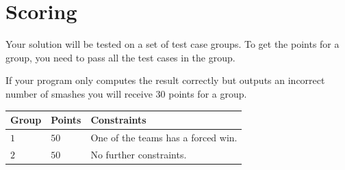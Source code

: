 \section*{Scoring}
Your solution will be tested on a set of test case groups.
To get the points for a group, you need to pass all the test cases in the group.

If your program only computes the result correctly but outputs an incorrect number of smashes you will receive $30$ points for a group.
\noindent
\begin{tabular}{| l | l | p{10cm} |}
\hline
Group & Points & Constraints \\ \hline
  $1$    & $50$        & One of the teams has a forced win.\\ \hline 
  $2$    & $50$        & No further constraints. \\ \hline 
\end{tabular}

